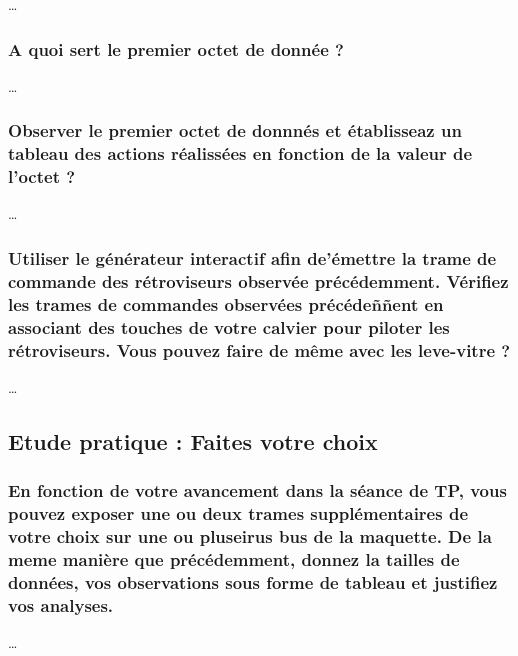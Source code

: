 \documentclass{rapportECC}
\begin{document}
\dots

\subsubsection*{A quoi sert le premier octet de donnée ?}

\dots

\subsubsection*{Observer le premier octet de donnnés et établisseaz un tableau des actions  réalissées en fonction de la valeur de l'octet ?}

\dots

\subsubsection*{Utiliser le générateur interactif afin de'émettre la trame de commande des rétroviseurs observée précédemment. Vérifiez les trames de commandes observées précédeññent en associant des touches de votre calvier pour piloter les rétroviseurs. Vous pouvez faire de même avec les leve-vitre ?}

\dots


\subsection{Etude pratique : Faites votre choix}

\subsubsection*{En fonction de votre avancement dans la séance de TP, vous pouvez exposer une ou deux trames supplémentaires de votre choix sur une ou pluseirus bus de la maquette. De la meme manière que précédemment, donnez la tailles de données, vos observations sous forme de tableau et justifiez vos analyses.}

\dots

\end{document}
